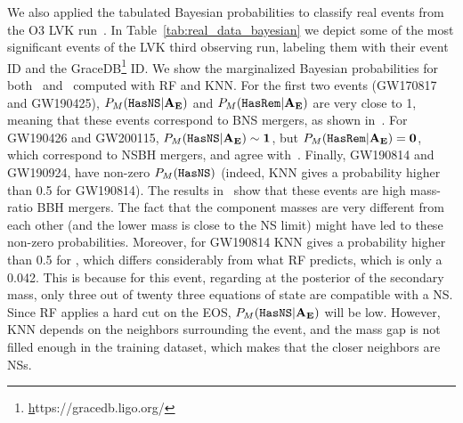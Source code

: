 We also applied the tabulated Bayesian probabilities to classify real events
from the O3 LVK run~\cite{LIGOScientific:2020ibl, LIGOScientific:2021djp}.  In Table~\ref{tab:real_data_bayesian} we depict some of the most significant events of the LVK third observing run, labeling them with their event ID and the GraceDB\footnote{\href{https://gracedb.ligo.org/}https://gracedb.ligo.org/} ID.  We show the marginalized Bayesian probabilities for both \hasns\ and \hasrem\ computed with 
\ac{RF} and \ac{KNN}. For the first two events (GW170817 and GW190425),
$P_M({{\tt HasNS}} |\bf{A_E})$ and $P_M({{\tt HasRem}} |\bf{A_E})$ are very close to 1, meaning that these events
correspond to BNS mergers, as shown in~\cite{LIGOScientific:2020ibl,LIGOScientific:2021djp}. 
For GW190426 and GW200115, $P_M({{\tt HasNS}} |\bf{A_E}) \sim 1$, but
$P_M({{\tt HasRem}} |\bf{A_E}) = 0$, which correspond to NSBH mergers, and agree 
with~\cite{LIGOScientific:2020ibl, LIGOScientific:2021djp}. Finally, GW190814 and GW190924,
have non-zero $P_M({{\tt HasNS}})$ (indeed, \ac{KNN} gives a probability higher than
0.5 for GW190814). The results in~\cite{LIGOScientific:2020ibl, LIGOScientific:2021djp} show that these events are high mass-ratio BBH mergers. The fact that the component masses are very different from each other (and the lower mass is close to the NS limit) might have led to these non-zero probabilities. Moreover, for GW190814 \ac{KNN} gives a probability higher than 0.5 for \hasns, which differs considerably from what \ac{RF} predicts, which is only a 0.042. This is because for this event, regarding at the posterior of the secondary mass, only three out of twenty three equations of state are compatible with a NS. Since \ac{RF} applies a hard cut on the EOS, $P_M({{\tt HasNS}}|{\bf A}_{\bf E})$ will be low. However, \ac{KNN} depends on the neighbors surrounding the event, and the mass gap is not filled enough in the training dataset, which makes that the closer neighbors are NSs. 

